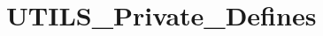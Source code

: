 \hypertarget{group___u_t_i_l_s___private___defines}{}\section{U\+T\+I\+L\+S\+\_\+\+Private\+\_\+\+Defines}
\label{group___u_t_i_l_s___private___defines}

